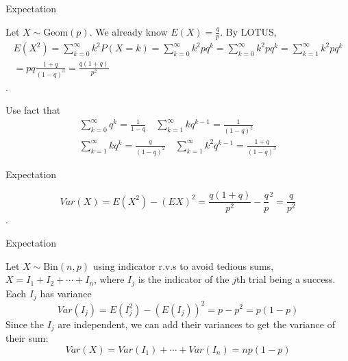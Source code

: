 \documentclass{beamer}
\begin{document}
\begin{frame}{Expectation}
    \begin{example}
        Let $X \sim \text{Geom}(p)$. We already know $E(X)=\frac{q}{p}$. By LOTUS,
        \[
        \begin{gathered}
            E(X^2) = \sum^\infty_{k=0} k^2 P(X=k)=\sum^\infty_{k=0} k^2 p q^k = \sum^\infty_{k=0} k^2 p q^k = \sum^{\infty}_{k=1} k^2 p q^k \\
            = pq \frac{1+q}{(1-q)^3} = \frac{q(1+q)}{p^2}
        \end{gathered}
        \].
    \end{example}
    Use fact that 
    \[
        \begin{gathered}
            \sum^\infty_{k=0} q^k = \frac{1}{1-q}\quad
            \sum^\infty_{k=1}kq^{k-1} = \frac{1}{(1-q)^2}\\
            \sum^\infty_{k=1}kq^k = \frac{q}{(1-q)^2}\quad
            \sum^\infty_{k=1}k^2 q^{k-1} = \frac{1+q}{(1-q)^3}
        \end{gathered}
    \]
\end{frame}

\begin{frame}{Expectation}
    \begin{example}
        \[
        Var(X) = E(X^2) - (EX)^2 = \frac{q(1+q)}{p^2} - \frac{q}{p}^2 = \frac{q}{p^2}
        \].
    \end{example}
\end{frame}



\begin{frame}{Expectation}
    \begin{example}
        Let $X \sim \text{Bin}(n,p)$ using indicator r.v.s to avoid tedious sums, $X=I_1+I_2+\cdots+I_n$, where $I_j$ is the indicator of the $j$th trial being a success. Each $I_j$ has variance
        \[
        Var(I_j) = E(I_j^2) - (E(I_j))^2 = p - p^2 = p(1-p)
        \]
        Since the $I_j$ are independent, we can add their variances to get the variance of their sum:
        \[
        Var(X) = Var(I_1) + \cdots + Var(I_n) = np(1-p)
        \]
    \end{example}
\end{frame}
\end{document}
